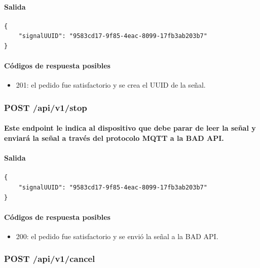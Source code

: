 \documentclass{article}
\begin{document}
\paragraph{
\textbf{Salida}
}

\begin{verbatim}
{
    "signalUUID": "9583cd17-9f85-4eac-8099-17fb3ab203b7"
}
\end{verbatim}

\paragraph{
Códigos de respuesta posibles
}
\begin{itemize}
    \item 201: el pedido fue satisfactorio y se crea el UUID de la señal.
\end{itemize}

\subsubsection{POST /api/v1/stop}
\paragraph{
Este endpoint le indica al dispositivo que debe parar de leer la señal y enviará la señal a través del protocolo MQTT a la BAD API.
}
\paragraph{
\textbf{Salida}
}

\begin{verbatim}
{
    "signalUUID": "9583cd17-9f85-4eac-8099-17fb3ab203b7"
}
\end{verbatim}

\paragraph{
Códigos de respuesta posibles
}
\begin{itemize}
    \item 200: el pedido fue satisfactorio y se envió la señal a la BAD API.
\end{itemize}

\subsubsection{POST /api/v1/cancel}
\end{document}
